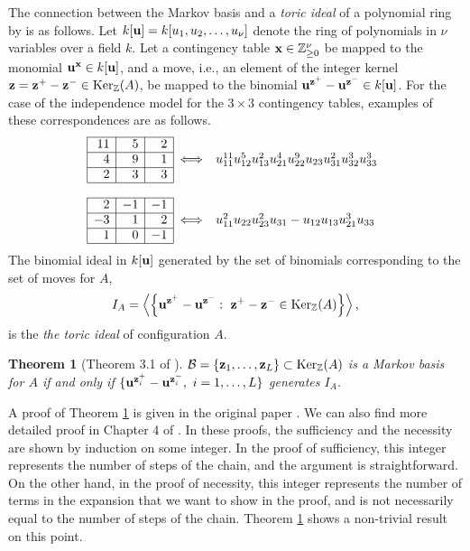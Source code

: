 \documentclass[12pt]{article}
\newtheorem{Theorem}{Theorem}[section]
\theoremstyle{definition}
\def\Bx{{\bf x}}
\def\Bu{{\bf u}}
\def\Bz{{\bf z}}
\begin{document}
The connection between the Markov basis and a {\it toric ideal} of a
polynomial ring by \cite{Diaconis-Sturmfels-1998} is as follows. Let 
$k[\Bu] = k[u_{1}, u_{2},\ldots,u_{\nu}]$ denote the ring of polynomials
in $\nu$ variables over a field $k$. Let 
a contingency table $\Bx \in \mathbb{Z}_{\geq
0}^{\nu}$ be mapped to the
      monomial $\Bu^{\Bx} \in k[\Bu]$, and a move, i.e., 
an element of the integer kernel $\Bz =
      \Bz^+ - \Bz^- \in {\rm
      Ker}_{\mathbb{Z}}(A)$, be mapped to the binomial $\Bu^{\Bz^+} -
      \Bu^{\Bz^-} \in k[\Bu]$. For the case of the independence model
      for the $3\times 3$ contingency
      tables, examples of these correspondences are as follows.
\[
\begin{array}{|r|r|r|cl}\cline{1-3}
11 & 5 & 2 & & \\ \cline{1-3}
4 & 9 & 1 & \Longleftrightarrow &
u_{11}^{11}u_{12}^5u_{13}^2u_{21}^4u_{22}^9u_{23}u_{31}^2u_{32}^3u_{33}^3
\\ \cline{1-3} 
2 & 3 & 3 & & \\ \cline{1-3}
\multicolumn{5}{c}{}\\ \cline{1-3}
2 & -1 & -1 & & \\ \cline{1-3}
-3 & 1 & 2 & \Longleftrightarrow & u_{11}^{2}u_{22}u_{23}^2u_{31} -
      u_{12}u_{13}u_{21}^3u_{33}\\ \cline{1-3} 
1 & 0 & -1 & & \\ \cline{1-3}
 \end{array} 
\]
The binomial ideal in $k[\Bu]$ generated by the set of
binomials corresponding to the set of moves for $A$, 
\[
 I_A = \left<\left\{
\Bu^{\Bz^+} - \Bu^{\Bz^-} :\ \Bz^+ - \Bz^- \in {\rm
      Ker}_{\mathbb{Z}}(A)
\right\}\right>, 
\]
is the {\it the toric ideal} of configuration $A$. 

\begin{Theorem}[Theorem 3.1 of \cite{Diaconis-Sturmfels-1998}]
\label{thm:thm3.1-DS}
${\cal B} = \{\Bz_1,\ldots,\Bz_L\} \subset {\rm Ker}_{\mathbb{Z}}(A)$ is
      a Markov basis for $A$ if and only if $\{\Bu^{\Bz_i^+} -
      \Bu^{\Bz_i^-},\ i = 1,\ldots,L\}$ generates $I_A$.
\end{Theorem}
A proof of Theorem \ref{thm:thm3.1-DS} is given in the original paper 
\cite{Diaconis-Sturmfels-1998}. We can also find more detailed proof in
Chapter 4 of \cite{dojo-en}. In these proofs, the sufficiency and the
necessity are shown by induction on some integer. In the proof of
sufficiency, this integer represents the number of steps of the chain,
and the argument is straightforward. On the other hand, in the proof of
necessity, this integer represents the number of 
terms in the expansion that we want to show in
the proof, and is not necessarily equal to the number of steps of the
chain. Theorem \ref{thm:thm3.1-DS} shows a non-trivial result on this point.
\end{document}
